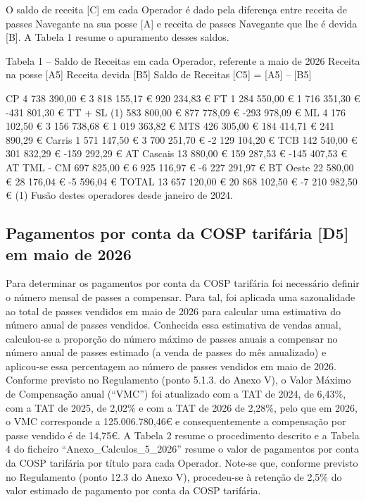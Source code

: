 \documentclass[
  a4paper,
]{article}
\begin{document}
O saldo de receita {[}C{]} em cada Operador é dado pela diferença entre
receita de passes Navegante na sua posse {[}A{]} e receita de passes
Navegante que lhe é devida {[}B{]}. A Tabela 1 resume o apuramento
desses saldos.

Tabela 1 -- Saldo de Receitas em cada Operador, referente a maio de 2026
Receita na posse {[}A5{]} Receita devida {[}B5{]} Saldo de Receitas
{[}C5{]} = {[}A5{]} -- {[}B5{]}

CP 4 738 390,00 € 3 818 155,17 € 920 234,83 € FT 1 284 550,00 € 1 716
351,30 € -431 801,30 € TT + SL (1) 583 800,00 € 877 778,09 € -293 978,09
€ ML 4 176 102,50 € 3 156 738,68 € 1 019 363,82 € MTS 426 305,00 € 184
414,71 € 241 890,29 € Carris 1 571 147,50 € 3 700 251,70 € -2 129 104,20
€ TCB 142 540,00 € 301 832,29 € -159 292,29 € AT Cascais 13 880,00 € 159
287,53 € -145 407,53 € AT TML - CM 697 825,00 € 6 925 116,97 € -6 227
291,97 € BT Oeste 22 580,00 € 28 176,04 € -5 596,04 € TOTAL 13 657
120,00 € 20 868 102,50 € -7 210 982,50 € (1) Fusão destes operadores
desde janeiro de 2024.

\subsection{Pagamentos por conta da COSP tarifária {[}D5{]} em maio de
2026}\label{pagamentos-por-conta-da-cosp-tarifuxe1ria-d5-em-maio-de-2026}

Para determinar os pagamentos por conta da COSP tarifária foi necessário
definir o número mensal de passes a compensar. Para tal, foi aplicada
uma sazonalidade ao total de passes vendidos em maio de 2026 para
calcular uma estimativa do número anual de passes vendidos. Conhecida
essa estimativa de vendas anual, calculou-se a proporção do número
máximo de passes anuais a compensar no número anual de passes estimado
(a venda de passes do mês anualizado) e aplicou-se essa percentagem ao
número de passes vendidos em maio de 2026. Conforme previsto no
Regulamento (ponto 5.1.3. do Anexo V), o Valor Máximo de Compensação
anual (``VMC'') foi atualizado com a TAT de 2024, de 6,43\%, com a TAT
de 2025, de 2,02\% e com a TAT de 2026 de 2,28\%, pelo que em 2026, o
VMC corresponde a 125.006.780,46€ e consequentemente a compensação por
passe vendido é de 14,75€. A Tabela 2 resume o procedimento descrito e a
Tabela 4 do ficheiro ``Anexo\_Calculos\_5\_2026'' resume o valor de
pagamentos por conta da COSP tarifária por título para cada Operador.
Note-se que, conforme previsto no Regulamento (ponto 12.3 do Anexo V),
procedeu-se à retenção de 2,5\% do valor estimado de pagamento por conta
da COSP tarifária.
\end{document}

